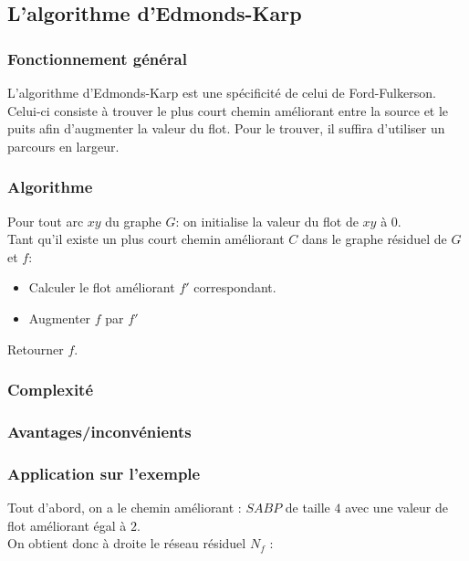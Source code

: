 \documentclass[a4paper]{article}
\begin{document}
\subsection{L'algorithme d'Edmonds-Karp}

\subsubsection{Fonctionnement général}
L'algorithme d'Edmonds-Karp est une spécificité de celui de Ford-Fulkerson. Celui-ci consiste à trouver le plus court chemin améliorant entre la source et le puits afin d'augmenter la valeur du flot. Pour le trouver, il suffira d'utiliser un parcours en largeur.\\

\subsubsection{Algorithme}
Pour tout arc $xy$ du graphe $G$: on initialise la valeur du flot de $xy$ à $0$.\\
Tant qu'il existe un plus court chemin améliorant $C$ dans le graphe résiduel de $G$ et $f$:
\begin{itemize}
	\item
    Calculer le flot améliorant $f'$ correspondant.
    \item 
    Augmenter $f$ par $f'$
\end{itemize}
Retourner $f$.\\

\subsubsection{Complexité}

\subsubsection{Avantages/inconvénients}

\subsubsection{Application sur l'exemple}
Tout d'abord, on a le chemin améliorant : $SABP$ de taille $4$ avec une valeur de flot améliorant égal à $2$.\\
On obtient donc à droite le réseau résiduel $N_f$ :
\end{document}
